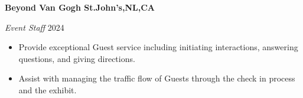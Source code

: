 \textbf{Beyond Van Gogh \hfill  St.John's,NL,CA} \par
\textit{Event Staff} \hfill 2024 \par
\begin{itemize}
	\item Provide exceptional Guest service including initiating interactions, answering questions, and giving directions.
	\item  Assist with managing the traffic flow of Guests through the check in process and the exhibit.
\end{itemize} \par